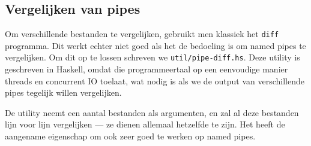 \documentclass[a4paper,11pt]{article}
\begin{document}
\subsection{Vergelijken van pipes}
\label{pipe-diff}

Om verschillende bestanden te vergelijken, gebruikt men klassiek het \verb#diff#
programma. Dit werkt echter niet goed als het de bedoeling is om named pipes
te vergelijken. Om dit op te lossen schreven we \verb#util/pipe-diff.hs#. Deze
utility is geschreven in Haskell, omdat die programmeertaal op een eenvoudige
manier threads en concurrent IO toelaat, wat nodig is als we de output van
verschillende pipes tegelijk willen vergelijken.

De utility neemt een aantal bestanden als argumenten, en zal al deze bestanden
lijn voor lijn vergelijken — ze dienen allemaal hetzelfde te zijn. Het heeft de
aangename eigenschap om ook zeer goed te werken op named pipes.
\end{document}
